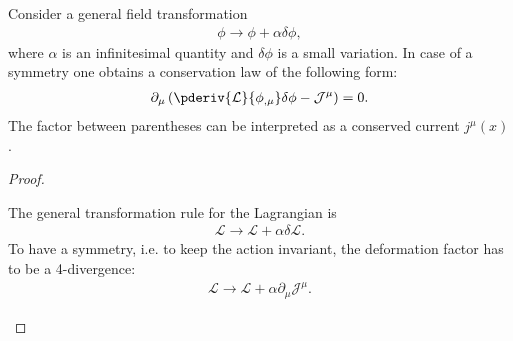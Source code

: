     \begin{theorem}\label{field:noethers_theorem}
        Consider a general field transformation
        \begin{gather}
            \phi\longrightarrow\phi+\alpha\delta\phi,
        \end{gather}
        where $\alpha$ is an infinitesimal quantity and $\delta\phi$ is a small variation. In case of a symmetry one obtains a conservation law of the following form:
        \begin{gather}
            \label{field:conserved_current}
            \partial_\mu\left(\pderiv{\mathcal{L}}{\phi_{,\mu}}\delta\phi - \mathcal{J}^\mu\right) = 0.
        \end{gather}
        The factor between parentheses can be interpreted as a conserved current $j^\mu(x)$.\\
        \begin{proof}
            \begin{mdframed}[roundcorner=10pt, linecolor=blue, linewidth=1pt]
                The general transformation rule for the Lagrangian is
                \begin{gather}
                    \label{noether_deriv:1}
                    \mathcal{L}\longrightarrow\mathcal{L} + \alpha\delta\mathcal{L}.
                \end{gather}
                To have a symmetry, i.e. to keep the action invariant, the deformation factor has to be a 4-divergence:
                \begin{gather}
                    \label{noether_deriv:2}
                    \mathcal{L}\longrightarrow\mathcal{L} + \alpha\partial_\mu\mathcal{J}^\mu.
                \end{gather}


\end{mdframed}
\end{proof}
\end{theorem}
